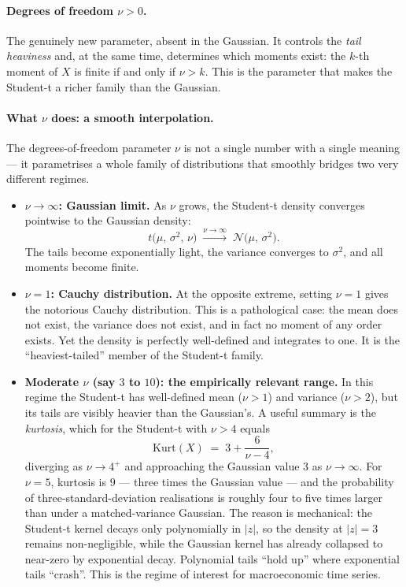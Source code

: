 \documentclass[11pt, a4paper, oneside]{article}
\begin{document}
\paragraph{Degrees of freedom $\nu > 0$.}
The genuinely new parameter, absent in the Gaussian. It controls the
\emph{tail heaviness} and, at the same time, determines which moments
exist: the $k$-th moment of $X$ is finite if and only if $\nu > k$.
This is the parameter that makes the Student-t a richer family than the
Gaussian.

\paragraph{What $\nu$ does: a smooth interpolation.}
The degrees-of-freedom parameter $\nu$ is not a single number with a
single meaning — it parametrises a whole family of distributions that
smoothly bridges two very different regimes.

\begin{itemize}[leftmargin=1.5em, itemsep=4pt]
    \item \textbf{$\nu \to \infty$: Gaussian limit.} As $\nu$ grows, the
          Student-t density converges pointwise to the Gaussian density:
          \[
          t\!\big(\mu,\, \sigma^2,\, \nu\big) \;\xrightarrow{\nu \to \infty}\;
          \mathcal{N}\!\big(\mu,\, \sigma^2\big).
          \]
          The tails become exponentially light, the variance converges to
          $\sigma^2$, and all moments become finite.
    \item \textbf{$\nu = 1$: Cauchy distribution.} At the opposite
          extreme, setting $\nu = 1$ gives the notorious Cauchy
          distribution. This is a pathological case: the mean does not
          exist, the variance does not exist, and in fact no moment of
          any order exists. Yet the density is perfectly well-defined
          and integrates to one. It is the ``heaviest-tailed'' member of
          the Student-t family.
    \item \textbf{Moderate $\nu$ (say $3$ to $10$): the empirically relevant
          range.} In this regime the Student-t has well-defined mean
          ($\nu > 1$) and variance ($\nu > 2$), but its tails are visibly
          heavier than the Gaussian's. A useful summary is the \emph{kurtosis},
          which for the Student-t with $\nu > 4$ equals
          \[
          \mathrm{Kurt}(X) \;=\; 3 + \frac{6}{\nu - 4},
          \]
          diverging as $\nu \to 4^+$ and approaching the Gaussian value $3$ as
          $\nu \to \infty$. For $\nu = 5$, kurtosis is $9$ — three times the
          Gaussian value — and the probability of three-standard-deviation
          realisations is roughly four to five times larger than under a
          matched-variance Gaussian. The reason is mechanical: the Student-t kernel decays only
          polynomially in $|z|$, so the density at $|z| = 3$ remains
          non-negligible, while the Gaussian kernel has already collapsed to
          near-zero by exponential decay. Polynomial tails ``hold up'' where
          exponential tails ``crash''. This is the regime of interest for
          macroeconomic time series.
\end{itemize}
\end{document}
